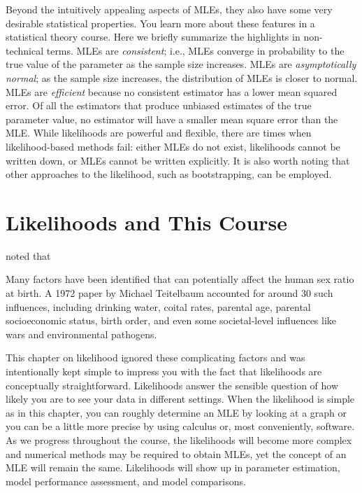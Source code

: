 \documentclass[
]{krantz}
\renewenvironment{quote}{\begin{VF}}{\end{VF}}
\begin{document}
Beyond the intuitively appealing aspects of MLEs, they also have some very desirable statistical properties. You learn more about these features in a statistical theory course. Here we briefly summarize the highlights in non-technical terms. MLEs are \emph{consistent}; i.e., MLEs converge in probability to the true value of the parameter as the sample size increases. MLEs are \emph{asymptotically normal}; as the sample size increases, the distribution of MLEs is closer to normal. MLEs are \emph{efficient} because no consistent estimator has a lower mean squared error. Of all the estimators that produce unbiased estimates of the true parameter value, no estimator will have a smaller mean square error than the MLE. While likelihoods are powerful and flexible, there are times when likelihood-based methods fail: either MLEs do not exist, likelihoods cannot be written down, or MLEs cannot be written explicitly. It is also worth noting that other approaches to the likelihood, such as bootstrapping, can be employed.

\hypertarget{likelihoods-and-this-course}{%
\section{Likelihoods and This Course}\label{likelihoods-and-this-course}}

\citet{Rodgers2001} noted that

\begin{quote}
Many factors have been identified that can potentially affect the human sex
ratio at birth. A 1972 paper by Michael Teitelbaum accounted for around 30
such influences, including drinking water, coital rates, parental age, parental
socioeconomic status, birth order, and even some societal-level influences like
wars and environmental pathogens.
\end{quote}

This chapter on likelihood ignored these complicating factors and was intentionally kept simple to impress you with the fact that likelihoods are conceptually straightforward. Likelihoods answer the sensible question of how likely you are to see your data in different settings. When the likelihood is simple as in this chapter, you can roughly determine an MLE by looking at a graph or you can be a little more precise by using calculus or, most conveniently, software. As we progress throughout the course, the likelihoods will become more complex and numerical methods may be required to obtain MLEs, yet the concept of an MLE will remain the same. Likelihoods will show up in parameter estimation, model performance assessment, and model comparisons.
\end{document}
